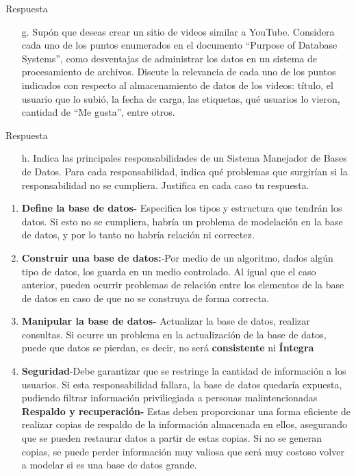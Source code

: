 \documentclass{article}
\begin{document}
\begin{enumerate}
    Respuesta
    
\begin{itemize}
    \item[g.]Supón que deseas crear un sitio de videos similar a YouTube. Considera cada uno de los puntos enumerados en el documento “Purpose of Database Systems”, como desventajas de administrar los datos en un sistema de procesamiento de archivos. Discute la relevancia de cada uno de los puntos indicados con respecto al almacenamiento de datos de los videos: título, el usuario que lo subió, la fecha de carga, las etiquetas, qué usuarios lo vieron, cantidad de “Me gusta”, entre otros.
    \end{itemize}
    
    Respuesta
    
\begin{itemize}
    \item[h.]Indica las principales responsabilidades de un Sistema Manejador de Bases de Datos. Para cada responsabilidad, indica qué problemas que surgirían si la responsabilidad no se cumpliera. Justifica en cada caso tu respuesta.
    \end{itemize}
\begin{enumerate}
\item \textbf{Define la base de datos-} Especifica los tipos y estructura que tendrán los datos. Si esto no se cumpliera, habría un problema de modelación en la base de datos, y por lo tanto no habría relación ni correctez.
\item \textbf{Construir una base de datos:}-Por medio de un algoritmo, dados algún tipo de datos, los guarda en un medio controlado. Al igual que el caso anterior, pueden ocurrir problemas de relación entre los elementos de la base de datos en caso de que no se construya de forma correcta.
\item \textbf{Manipular la base de datos-} Actualizar la base de datos, realizar consultas. Si ocurre un problema en la actualización de la base de datos, puede que datos se pierdan, es decir, no será \textbf{consistente} ni \textbf{Íntegra}
\item \textbf{Seguridad}-Debe garantizar que se restringe la cantidad de información a los usuarios. Si esta responsabilidad fallara, la base de datos quedaría expuesta, pudiendo filtrar información priviliegiada a personas malintencionadas
\textbf{Respaldo y recuperación-} Estas deben proporcionar una forma eficiente de realizar copias de respaldo de la información almacenada en ellos, asegurando que se pueden restaurar datos a partir de estas copias. Si no se generan copias, se puede perder información muy valiosa que será muy costoso volver a modelar si es una base de datos grande.

\end{enumerate}
\end{enumerate}
\end{document}
